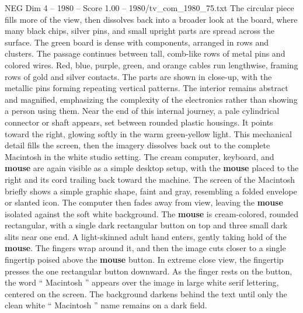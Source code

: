 \begin{textsample}{NEG Dim 4 – 1980 – Score 1.00 – 1980/tv\_com\_1980\_75.txt}
The circular piece fills more of the view, then dissolves back into a broader look at the board, where many black chips, silver pins, and small upright parts are spread across the surface.
The green board is dense with components, arranged in rows and clusters.
The passage continues between tall, comb-like rows of metal pins and colored wires.
Red, blue, purple, green, and orange cables run lengthwise, framing rows of gold and silver contacts.
The parts are shown in close-up, with the metallic pins forming repeating vertical patterns.
The interior remains abstract and magnified, emphasizing the complexity of the electronics rather than showing a person using them.
Near the end of this internal journey, a pale cylindrical connector or shaft appears, set between rounded plastic housings.
It points toward the right, glowing softly in the warm green-yellow light.
This mechanical detail fills the screen, then the imagery dissolves back out to the complete Macintosh in the white studio setting.
The cream computer, keyboard, and \textbf{mouse} are again visible as a simple desktop setup, with the \textbf{mouse} placed to the right and its cord trailing back toward the machine.
The screen of the Macintosh briefly shows a simple graphic shape, faint and gray, resembling a folded envelope or slanted icon.
The computer then fades away from view, leaving the \textbf{mouse} isolated against the soft white background.
The \textbf{mouse} is cream-colored, rounded rectangular, with a single dark rectangular button on top and three small dark slits near one end.
A light-skinned adult hand enters, gently taking hold of the \textbf{mouse}.
The fingers wrap around it, and then the image cuts closer to a single fingertip poised above the \textbf{mouse} button.
In extreme close view, the fingertip presses the one rectangular button downward.
As the finger rests on the button, the word “ Macintosh ” appears over the image in large white serif lettering, centered on the screen.
The background darkens behind the text until only the clean white “ Macintosh ” name remains on a dark field.

\end{textsample}
